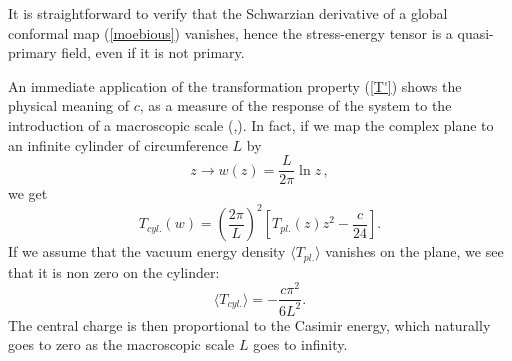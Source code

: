 \documentclass[a4paper,12pt]{report}
\begin{document}
It is straightforward to verify that the Schwarzian derivative of a global conformal map (\ref{moebious})
vanishes, hence the stress-energy tensor is a quasi-primary field, even if it is not primary.

An immediate application of the transformation property (\ref{T'}) shows the physical meaning of $c$, as a
measure of the response of the system to the introduction of a macroscopic scale
(\cite{casimir1},\cite{casimir2}). In fact, if we map the complex plane to an infinite cylinder of circumference
$L$ by
\begin{equation}\label{cyl}
z\rightarrow w(z)=\frac{L}{2\pi}\ln z\,,
\end{equation}
we get
\begin{equation}
T_{cyl.}(w)=\left(\frac{2\pi}{L}\right)^{2}\left[T_{pl.}(z)z^{2}-\frac{c}{24}\right].
\end{equation}
If we assume that the vacuum energy density $\langle T_{pl.}\rangle$ vanishes on the plane, we see that it is non
zero on the cylinder:
\begin{equation}\label{cas}
\langle T_{cyl.}\rangle=-\frac{c\pi^{2}}{6L^{2}}.
\end{equation}
The central charge is then proportional to the Casimir energy, which naturally goes to zero as the macroscopic
scale $L$ goes to infinity.


\vspace{0.5cm}
\end{document}
